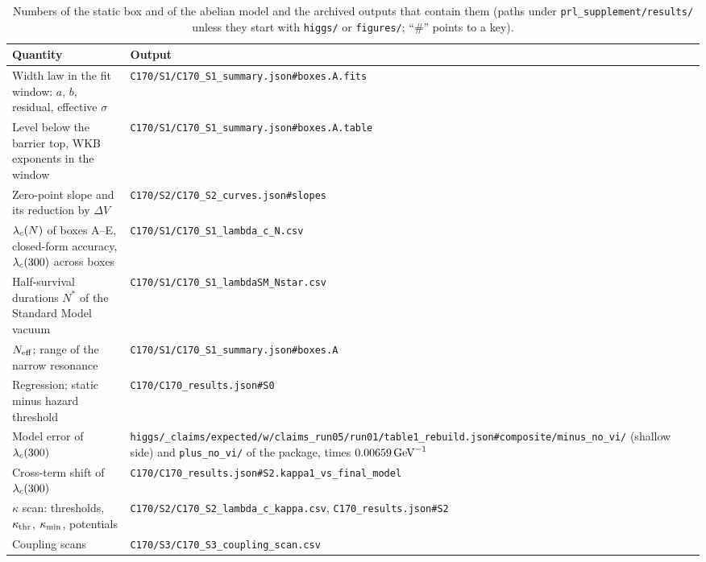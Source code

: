 \begin{table}[ht]
\centering
\small
\caption{Numbers of the static box and of the abelian model and the archived outputs that contain them (paths under \texttt{prl\_supplement/\allowbreak results/} unless they start with \texttt{higgs/} or \texttt{figures/}; ``\#'' points to a key).}
\label{tab:v11-supplement-map}
\begin{tabular}{@{}p{}p{}@{}}
\toprule
Quantity & Output \\
\midrule
Width law in the fit window: $a$, $b$, residual, effective $\sigma$ & \texttt{C170/\allowbreak S1/\allowbreak C170\_S1\_summary.json\#boxes.A.fits} \\
Level below the barrier top, WKB exponents in the window & \texttt{C170/\allowbreak S1/\allowbreak C170\_S1\_summary.json\#boxes.A.table} \\
Zero-point slope and its reduction by $\Delta V$ & \texttt{C170/\allowbreak S2/\allowbreak C170\_S2\_curves.json\#slopes} \\
$\lambda_c(N)$ of boxes A--E, closed-form accuracy, $\lambda_c(300)$ across boxes & \texttt{C170/\allowbreak S1/\allowbreak C170\_S1\_lambda\_c\_N.csv} \\
Half-survival durations $N^*$ of the Standard Model vacuum & \texttt{C170/\allowbreak S1/\allowbreak C170\_S1\_lambdaSM\_Nstar.csv} \\
$N_{\rm eff}$; range of the narrow resonance & \texttt{C170/\allowbreak S1/\allowbreak C170\_S1\_summary.json\#boxes.A} \\
Regression; static minus hazard threshold & \texttt{C170/\allowbreak C170\_results.json\#S0} \\
Model error of $\lambda_c(300)$ & \texttt{higgs/\allowbreak 09\_claims/\allowbreak expected/\allowbreak w/\allowbreak claims\_run05/\allowbreak run01/\allowbreak table1\_rebuild.json\#composite/\allowbreak minus\_no\_vi/\allowbreak 0.5} (shallow side) and \texttt{plus\_no\_vi/\allowbreak 0.5} of the package, times $0.00659\,\mathrm{GeV}^{-1}$ \\
Cross-term shift of $\lambda_c(300)$ & \texttt{C170/\allowbreak C170\_results.json\#\allowbreak S2.\allowbreak kappa1\_vs\_\allowbreak final\_model} \\
$\kappa$ scan: thresholds, $\kappa_{\rm thr}$, $\kappa_{\rm min}$, potentials & \texttt{C170/\allowbreak S2/\allowbreak C170\_S2\_lambda\_c\_kappa.csv}, \texttt{C170\_results.json\#S2} \\
Coupling scans & \texttt{C170/\allowbreak S3/\allowbreak C170\_S3\_coupling\_scan.csv} \\

\end{tabular}
\end{table}
